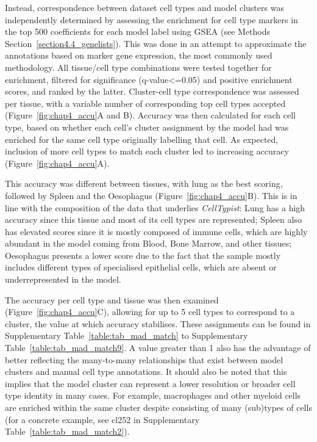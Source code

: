 Instead, correspondence between dataset cell types and model clusters was independently determined by assessing the enrichment for cell type markers in the top 500 coefficients for each model label using GSEA (see Methods Section~\ref{section4.4_genelists}). This was done in an attempt to approximate the annotations based on marker gene expression, the most commonly used methodology. All tissue/cell type combinations were tested together for enrichment, filtered for significance (q-value<=0.05) and positive enrichment scores, and ranked by the latter. Cluster-cell type correspondence was assessed per tissue, with a variable number of corresponding top cell types accepted (Figure~\ref{fig:chap4_accu}A and B). Accuracy was then calculated for each cell type, based on whether each cell's cluster assignment by the model had was enriched for the same cell type originally labelling that cell. As expected, inclusion of more cell types to match each cluster led to increasing accuracy (Figure~\ref{fig:chap4_accu}A). 

This accuracy was different between tissues, with lung as the best scoring, followed by Spleen and the Oesophagus (Figure~\ref{fig:chap4_accu}B). This is in line with the composition of the data that underlies \textit{CellTypist}: Lung has a high accuracy since this tissue and most of its cell types are represented; Spleen also has elevated scores since it is mostly composed of immune cells, which are highly abundant in the model coming from Blood, Bone Marrow, and other tissues; Oesophagus presents a lower score due to the fact that the sample mostly includes different types of specialised epithelial cells, which are absent or underrepresented in the model.

The accuracy per cell type and tissue was then examined (Figure~\ref{fig:chap4_accu}C), allowing for up to 5 cell types to correspond to a cluster, the value at which accuracy stabilises. These assignments can be found in Supplementary Table~\ref{table:tab_mad_match} to Supplementary Table~\ref{table:tab_mad_match9}. A value greater than 1 also has the advantage of better reflecting the many-to-many relationships that exist between model clusters and manual cell type annotations. It should also be noted that this implies that the model cluster can represent a lower resolution or broader cell type identity in many cases.  For example, macrophages and other myeloid cells are enriched within the same cluster despite consisting of many (sub)types of cells (for a concrete example, see cl252 in Supplementary Table~\ref{table:tab_mad_match2}). 


